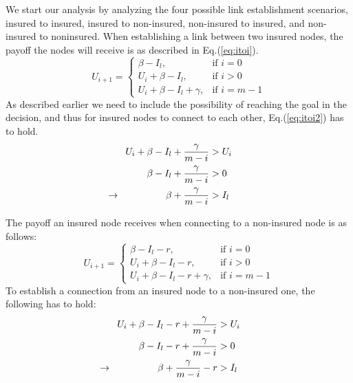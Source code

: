 We start our analysis by analyzing the four possible link establishment scenarios, insured
to insured, insured to non-insured, non-insured to insured, and non-insured to noninsured.
When establishing a link between two insured nodes, the payoff the nodes will receive is as described in Eq.(\ref{eq:itoi}).
\begin{equation}
    U_{i+1}= 
\begin{cases}
    \beta - I_{l},& \text{if } i = 0\\
    U_{i}+\beta -I_{l},& \text{if }  i>0\\
    U_{i}+\beta -I_{l}+\gamma,& \text{if } i=m-1
    
\end{cases}
\label{eq:itoi}
\end{equation}
As described earlier we need to include the possibility of reaching the goal in the decision, and thus for insured nodes to connect to each other, Eq.(\ref{eq:itoi2}) has to hold.
\begin{eqnarray}
U_{i}+\beta-I_{l}+\frac{\gamma}{m-i}&>U_{i} \nonumber \\ 
\beta-I_{l}+\frac{\gamma}{m-i}&>0 \nonumber \\ 
\llap{$\rightarrow$\hspace{50pt}} \beta+\frac{\gamma}{m-i}&>I_{l} 
\label{eq:itoi2}
\end{eqnarray}

The payoff an insured node receives when connecting to a non-insured node is as follows:
\begin{equation}
    U_{i+1}= 
\begin{cases}
    \beta  - I_{l} -r,& \text{if } i = 0\\
    U_{i}+\beta -I_{l}-r,& \text{if }  i>0\\
    U_{i}+\beta -I_{l}-r+\gamma,& \text{if } i=m-1
\end{cases}
\label{eq:itonoti}
\end{equation}
To establish a connection from an insured node to a non-insured one, the following has to hold:
\begin{eqnarray}
U_{i}+\beta-I_{l}-r+\frac{\gamma}{m-i}&>U_{i} \nonumber \\ 
\beta-I_{l}-r+\frac{\gamma}{m-i}&>0 \nonumber \\ 
\llap{$\rightarrow$\hspace{50pt}} \beta+\frac{\gamma}{m-i}-r&>I_{l} 
\end{eqnarray}

